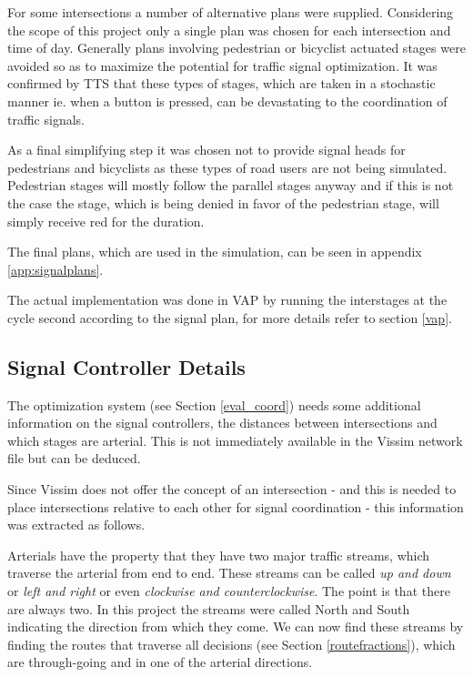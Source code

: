 For some intersections a number of alternative plans were supplied. Considering the scope of this project only a single plan was chosen for each intersection and time of day. Generally plans involving pedestrian or bicyclist actuated stages were avoided so as to maximize the potential for traffic signal optimization. It was confirmed by TTS that these types of stages, which are taken in a stochastic manner ie. when a button is pressed, can be devastating to the coordination of traffic signals.

As a final simplifying step it was chosen not to provide signal heads for pedestrians and bicyclists as these types of road users are not being simulated. Pedestrian stages will mostly follow the parallel stages anyway and if this is not the case the stage, which is being denied in favor of the pedestrian stage, will simply receive red for the duration.

The final plans, which are used in the simulation, can be seen in appendix \ref{app:signalplans}.

The actual implementation was done in VAP by running the interstages at the cycle second according to the signal plan, for more details refer to section \ref{vap}.

\subsection{Signal Controller Details}
\label{signal_details}
The optimization system (see Section \ref{eval_coord}) needs some additional information on the signal controllers, the distances between intersections and which stages are arterial. This is not immediately available in the Vissim network file but can be deduced.

Since Vissim does not offer the concept of an intersection - and this is needed to place intersections relative to each other for signal coordination - this information was extracted as follows.

Arterials have the property that they have two major traffic streams, which traverse the arterial from end to end. These streams can be called \textit{up and down} or \textit{left and right} or even \textit{clockwise and counterclockwise}. The point is that there are always two. In this project the streams were called North and South indicating the direction from which they come. We can now find these streams by finding the routes that traverse all decisions (see Section \ref{routefractions}), which are through-going and in one of the arterial directions.


